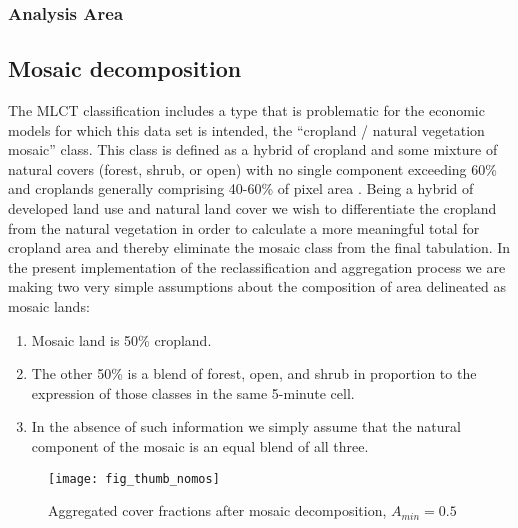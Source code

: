 \subsubsection{Analysis Area}
\label{sec:agg-analysis-area}


\subsection{Mosaic decomposition}
\label{sec:elimination}

The MLCT classification includes a type that is problematic for the
economic models for which this data set is intended, the ``cropland /
natural vegetation mosaic'' class.  This class is defined as a hybrid
of cropland and some mixture of natural covers (forest, shrub, or
open) with no single component exceeding 60\% \citep{Friedl2002} and
croplands generally comprising 40-60\% of pixel area . Being a hybrid of developed land use and natural land cover
we wish to differentiate the cropland from the natural vegetation in
order to calculate a more meaningful total for cropland area and
thereby eliminate the mosaic class from the final tabulation.  In the
present implementation of the reclassification and aggregation process
we are making two very simple assumptions about the composition of
area delineated as mosaic lands:

\begin{enumerate}
\item Mosaic land is 50\% cropland.
\item The other 50\% is a blend of forest, open, and shrub in
  proportion to the expression of those classes in the same 5-minute
  cell.
\item In the absence of such information we simply assume that the
  natural component of the mosaic is an equal blend of all three.
\end{enumerate}



\begin{figure} 
\begin{center}
  


\texttt{[image: fig\_thumb\_nomos]}
\end{center} 
\caption{Aggregated cover fractions after mosaic decomposition, $A_{min}=0.5$}
\label{fig:thumb_nomos}
\end{figure} 


